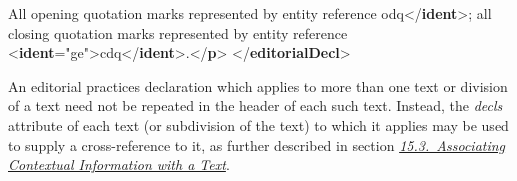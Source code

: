 \begin{shaded}
\mbox{}\newline 
\hspace*{1em}All opening quotation marks represented by entity reference\mbox{}\newline 
\hspace*{1em}odq{</\textbf{ident}>}; all closing quotation marks\mbox{}\newline 
\hspace*{1em}\hspace*{1em}\hspace*{1em}\hspace*{1em} represented by entity reference {<\textbf{ident}\hspace*{1em}{type}="{ge}">}cdq{</\textbf{ident}>}.{</\textbf{p}>}\mbox{}\newline 
{}\mbox{}\newline 
{</\textbf{editorialDecl}>}\end{shaded}\egroup\par \par
An editorial practices declaration which applies to more than one text or division of a text need not be repeated in the header of each such text. Instead, the {\itshape decls} attribute of each text (or subdivision of the text) to which it applies may be used to supply a cross-reference to it, as further described in section \textit{\hyperref[CCAS]{15.3.\ Associating Contextual Information with a Text}}.
